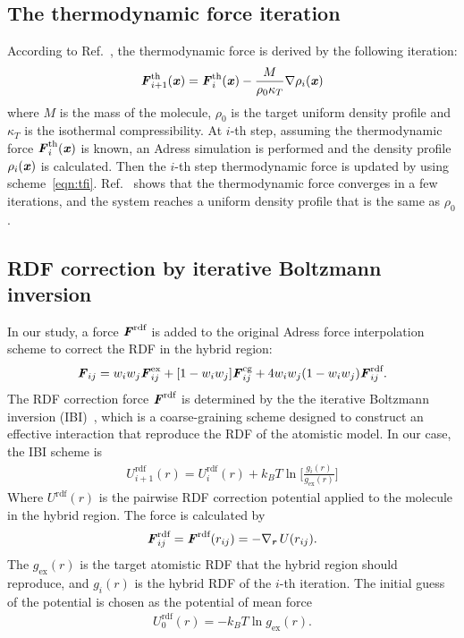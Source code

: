 \documentclass[aps,pre,preprint,unsortedaddress]{revtex4}
\renewcommand{\v}[1]{\textbf{\textit{#1}}}
\begin{document}
\subsection{The thermodynamic force iteration }

According to Ref.~\cite{fritsch2011grand}, the thermodynamic force is derived
by the following iteration:
\begin{align}\label{eqn:tfi}
  \v F^{\textrm{th}}_{i+1}(\v x) = \v F^{\textrm{th}}_i(\v x)
  - \frac{M}{\rho_0\kappa_T}\nabla\rho_i(\v x)
\end{align}
where $M$ is the mass of the molecule, $\rho_0$ is the
target uniform density profile and $\kappa_T$ is the
isothermal compressibility. At $i$-th step, assuming the thermodynamic
force $\v F^{\textrm{th}}_i(\v x)$ is known, an Adress simulation is
performed and the density profile $\rho_i(\v x)$ is calculated. Then
the $i$-th step thermodynamic force is updated by using
scheme~\eqref{eqn:tfi}.  Ref.~\cite{fritsch2011grand} shows that the
thermodynamic force converges in a few iterations, and the system
reaches a uniform density profile that is the same as $\rho_0$.

\subsection{RDF correction by iterative Boltzmann inversion}

In our study, a force $\v F^{\textrm{rdf}}$ is added to the
original Adress force interpolation scheme to correct the RDF in
the hybrid region:
\begin{align}
  \v F_{ij} = w_iw_j\v F^{\textrm{ex}}_{ij} + [1-w_iw_j]\v F^{\textrm{cg}}_{ij} +
  4 w_iw_j (1 - w_iw_j)\v F_{ij}^{\textrm{rdf}}.
\end{align}
The RDF correction force $\v F^{\textrm{rdf}}$ is determined by the the
iterative Boltzmann inversion (IBI)~\cite{mueller2002coarse,
  reith2003deriving}, which is a coarse-graining scheme designed to
construct an effective interaction that reproduce the RDF of the
atomistic model. In our case, the IBI scheme is 
\begin{align}\label{eqn:ibi}
  U^{\textrm{rdf}}_{i+1}(r) = U^{\textrm{rdf}}_i(r) +
  k_B T\ln\bigg[
  \frac{g_i(r)}{g_{\textrm{ex}}(r)}
  \bigg]
\end{align}
Where $U^{\textrm{rdf}}(r)$ is the pairwise RDF correction potential
applied to the molecule in the hybrid region. The force is
calculated by
\begin{align}
  \v F^{\textrm{rdf}}_{ij} = \v F^{\textrm{rdf}}(r_{ij})
  = -\nabla_{\v r}\,U(r_{ij}).
\end{align}
The $g_{\textrm{ex}}(r)$ is the target atomistic RDF that the hybrid
region should reproduce, and $g_i(r)$ is the hybrid RDF of the $i$-th
iteration.  The initial guess of the potential is chosen as the
potential of mean force
\begin{align}\label{eqn:pmf}
  U^{\textrm{rdf}}_0(r) = -k_BT \ln g_{\textrm{ex}}(r).
\end{align}
\end{document}

